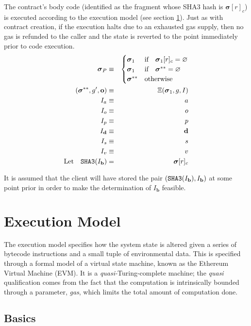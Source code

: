 \documentclass[9pt,oneside]{amsart}
\begin{document}
\begin{multicols}{2}
The contract's body code (identified as the fragment whose SHA3 hash is $\boldsymbol{\sigma}[r]_c$) is executed according to the execution model (see section \ref{ch:model}). Just as with contract creation, if the execution halts due to an exhausted gas supply, then no gas is refunded to the caller and the state is reverted to the point immediately prior to code execution.
\begin{eqnarray}
\boldsymbol{\sigma}_P & \equiv & \begin{cases}
\boldsymbol{\sigma}_1 & \text{if} \quad \boldsymbol{\sigma}_1[r]_c = \varnothing \\
\boldsymbol{\sigma}_1 & \text{if} \quad \boldsymbol{\sigma}^{**} = \varnothing \\
\boldsymbol{\sigma}^{**} & \text{otherwise}
\end{cases} \\
(\boldsymbol{\sigma}^{**}, g', \mathbf{o}) & \equiv & \Xi(\boldsymbol{\sigma}_1, g, I) \\
I_a & \equiv & a \\
I_o & \equiv & o \\
I_p & \equiv & p \\
I_\mathbf{d} & \equiv & \mathbf{d} \\
I_s & \equiv & s \\
I_v & \equiv & v \\
\text{Let} \quad \mathtt{\tiny SHA3}(I_\mathbf{b}) & = & \boldsymbol{\sigma}[r]_c
\end{eqnarray}

It is assumed that the client will have stored the pair $(\mathtt{\tiny SHA3}(I_\mathbf{b}), I_\mathbf{b})$ at some point prior in order to make the determination of $I_\mathbf{b}$ feasible.

\section{Execution Model} \label{ch:model}

The execution model specifies how the system state is altered given a series of bytecode instructions and a small tuple of environmental data. This is specified through a formal model of a virtual state machine, known as the Ethereum Virtual Machine (EVM). It is a \textit{quasi-}Turing-complete machine; the \textit{quasi} qualification comes from the fact that the computation is intrinsically bounded through a parameter, \textit{gas}, which limits the total amount of computation done.

\subsection{Basics}


\end{multicols}
\end{document}
